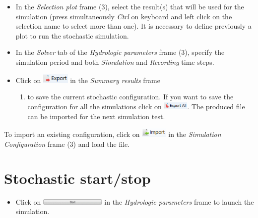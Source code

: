 \documentclass[
  letterpaper,
  DIV=11,
  numbers=noendperiod]{scrreprt}
\providecommand{\tightlist}{%
  \setlength{\itemsep}{0pt}\setlength{\parskip}{0pt}}\usepackage{longtable,booktabs,array}
\begin{document}
\begin{itemize}
\item
  {In the \emph{Selection plot} frame (3), select the result(s) that
  will be used for the simulation (press simultaneously \emph{Ctrl} on
  keyboard and left click on the selection name to select more than
  one). It is necessary to define previously a plot to run the
  stochastic simulation.}
\item
  {In the \emph{Solver} tab of the \emph{Hydrologic parameters} frame
  (3), specify the simulation period and both \emph{Simulation} and
  \emph{Recording} time steps.}
\item
  Click on
  \includegraphics[width=\textwidth,height=0.19in]{./figures/fig-icon_calibrator_export_config.png}
  in the \emph{Summary results} frame

  \begin{enumerate}
  \def\labelenumi{(\arabic{enumi})}
  \setcounter{enumi}{2}
  \tightlist
  \item
    to save the current stochastic configuration. If you want to save
    the configuration for all the simulations click on
    \includegraphics[width=\textwidth,height=0.15in]{./figures/fig-icon_calibrator_export_all_config.png}.
    The produced file can be imported for the next simulation test.
  \end{enumerate}
\end{itemize}

{To import an existing configuration, click on
\includegraphics[width=\textwidth,height=0.19in]{./figures/fig-icon_calibrator_import_config.png}
in the \emph{Simulation Configuration} frame (3) and load the file.}

\hypertarget{stochastic-startstop}{%
\section{Stochastic start/stop}\label{stochastic-startstop}}

\begin{itemize}
\tightlist
\item
  {Click on
  \includegraphics[width=\textwidth,height=0.11in]{./figures/fig-icon_calibrator_start.png}
  in the \emph{Hydrologic parameters} frame to launch the simulation.}
\end{itemize}
\end{document}
